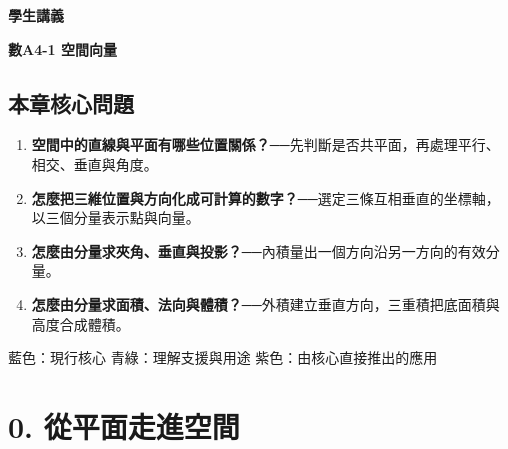 \documentclass[11pt,a4paper]{article}
\providecommand{\tightlist}{%
  \setlength{\itemsep}{0pt}\setlength{\parskip}{0pt}}
\begin{document}
\begin{tcolorbox}[
  enhanced,colback=white,colframe=HandoutBlue,boxrule=1.1pt,arc=2mm,
  borderline west={3pt}{0pt}{HandoutBlue},left=5mm,right=4mm,top=4mm,bottom=4mm
]
{\sffamily\small\bfseries\color{HandoutBlue}學生講義}\par
{\sffamily\bfseries\LARGE\color{HandoutInk}數A4-1 空間向量}\par
\vspace{0.35em}{\large 用三個分量描述空間中的位置、方向、投影、面積與體積}\par
{}\par
{}\par
\end{tcolorbox}


\begin{HandoutLearningMap}

\subsection{本章核心問題}\label{ux672cux7ae0ux6838ux5fc3ux554fux984c}

\begin{enumerate}
\def\labelenumi{\arabic{enumi}.}
\tightlist
\item
  \textbf{空間中的直線與平面有哪些位置關係？}──先判斷是否共平面，再處理平行、相交、垂直與角度。
\item
  \textbf{怎麼把三維位置與方向化成可計算的數字？}──選定三條互相垂直的坐標軸，以三個分量表示點與向量。
\item
  \textbf{怎麼由分量求夾角、垂直與投影？}──內積量出一個方向沿另一方向的有效分量。
\item
  \textbf{怎麼由分量求面積、法向與體積？}──外積建立垂直方向，三重積把底面積與高度合成體積。
\end{enumerate}

{藍色：現行核心}
{青綠：理解支援與用途}
{紫色：由核心直接推出的應用}

\end{HandoutLearningMap}

\section{0. 從平面走進空間}\label{ux5f9eux5e73ux9762ux8d70ux9032ux7a7aux9593}
\end{document}

